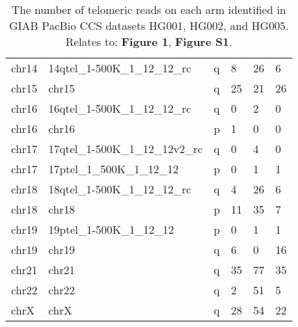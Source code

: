 \begin{samepage}
\begin{table}[h!]
\begin{tabular}{llllll}
chr14                &  14qtel\_1-500K\_1\_12\_12\_rc    &  q             &  8               &  26              &  6              \\
chr15                &  chr15                            &  q             &  25              &  21              &  26             \\
chr16                &  16qtel\_1-500K\_1\_12\_12\_rc    &  q             &  0               &  2               &  0              \\
chr16                &  chr16                            &  p             &  1               &  0               &  0              \\
chr17                &  17qtel\_1-500K\_1\_12\_12v2\_rc  &  q             &  0               &  4               &  0              \\
chr17                &  17ptel\_1\_500K\_1\_12\_12       &  p             &  0               &  1               &  1              \\
chr18                &  18qtel\_1-500K\_1\_12\_12\_rc    &  q             &  4               &  26              &  6              \\
chr18                &  chr18                            &  p             &  11              &  35              &  7              \\
chr19                &  19ptel\_1-500K\_1\_12\_12        &  p             &  0               &  1               &  1              \\
chr19                &  chr19                            &  q             &  6               &  0               &  16             \\
chr21                &  chr21                            &  q             &  35              &  77              &  35             \\
chr22                &  chr22                            &  q             &  2               &  51              &  5              \\
chrX                 &  chrX                             &  q             &  28              &  54              &  22             \\
\hline
\end{tabular}
\caption{The number of telomeric reads on each arm identified in GIAB PacBio CCS datasets HG001, HG002, and HG005. Relates to: \textbf{Figure 1}, \textbf{Figure S1}.}
\label{tab:telomeric_read_counts}
\end{table}
\end{samepage}
